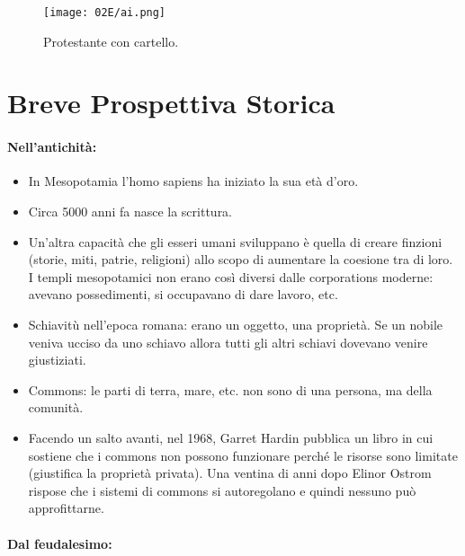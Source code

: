 \begin{figure}[H]
    \centering
    \texttt{[image: 02E/ai.png]}
    \caption{Protestante con cartello.}
\end{figure}

\section{Breve Prospettiva Storica}


\paragraph{Nell'antichità:}

\begin{itemize}
  \item In Mesopotamia l'homo sapiens ha iniziato la sua età d'oro. 
  \item Circa 5000 anni fa nasce la scrittura. 
  \item Un'altra capacità che gli esseri umani sviluppano è quella di creare finzioni (storie, miti, patrie, religioni) allo scopo di aumentare la coesione tra di loro. I templi mesopotamici non erano così diversi dalle corporations moderne: avevano possedimenti, si occupavano di dare lavoro, etc. 
  \item Schiavitù nell'epoca romana: erano un oggetto, una proprietà. Se un nobile veniva ucciso da uno schiavo allora tutti gli altri schiavi dovevano venire giustiziati. 
  \item Commons: le parti di terra, mare, etc. non sono di una persona, ma della comunità.
  \item Facendo un salto avanti, nel 1968, Garret Hardin pubblica un libro in cui sostiene che i commons non  possono funzionare perché le risorse sono limitate (giustifica la proprietà privata). Una ventina di anni dopo Elinor Ostrom rispose che i sistemi di commons si autoregolano e quindi nessuno può approfittarne.
\end{itemize}

\paragraph{Dal feudalesimo:}

